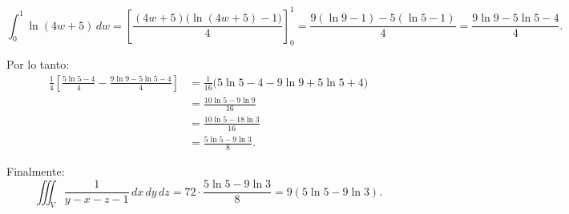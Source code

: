 \[
    \int_0^1 \ln(4w+5)\,dw
    = \left[\frac{(4w+5)\bigl(\ln(4w+5)-1\bigr)}{4}\right]_0^1
    = \frac{9(\ln 9 - 1) - 5(\ln 5 - 1)}{4}
    = \frac{9\ln 9 - 5\ln 5 - 4}{4}.
\]

Por lo tanto:
\begin{align*}
    \frac{1}{4}\left[\frac{5\ln 5 - 4}{4} - \frac{9\ln 9 - 5\ln 5 - 4}{4}\right]
    &= \frac{1}{16}\bigl(5\ln 5 - 4 - 9\ln 9 + 5\ln 5 + 4\bigr)\\
    &= \frac{10\ln 5 - 9\ln 9}{16}\\
    &= \frac{10\ln 5 - 18\ln 3}{16}\\
    &= \frac{5\ln 5 - 9\ln 3}{8}.
\end{align*}

Finalmente:
\[
    \iiint_{V} \frac{1}{y-x-z-1}\,dx\,dy\,dz
    = 72 \cdot \frac{5\ln 5 - 9\ln 3}{8}
    = \boxed{9(5\ln 5 - 9\ln 3)}.
\]